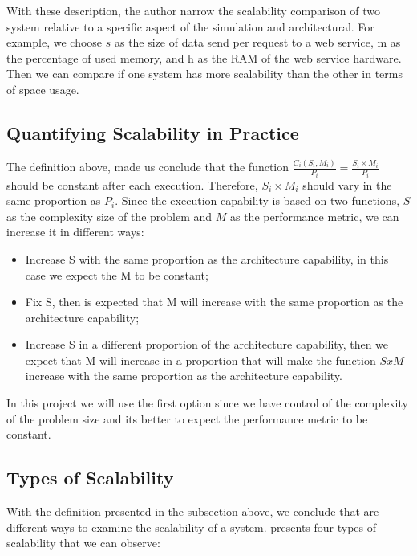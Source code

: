 With these description, the author narrow the scalability comparison of two system relative to a specific aspect of the simulation and architectural. For example, we choose $s$ as the size of data send per request to a web service, m as the percentage of used memory, and h as the RAM of the web service hardware. Then we can compare if one system has more scalability than the other in terms of space usage.

\subsection{Quantifying Scalability in Practice}

The definition above, made us conclude that the function $\frac{C_{i}(S_{i},M_{i})}{P_{i}} = \frac{S_{i} \times M_{i}}{P_{i}}$ should be constant after each execution. Therefore, $S_{i} \times M_{i}$ should vary in the same proportion as $P_{i}$. Since the execution capability is based on two functions, $S$ as the complexity size of the problem and $M$ as the performance metric, we can increase it in different ways:
\begin{itemize}
\item Increase S with the same proportion as the architecture capability, in this case we expect the M to be constant;
\item Fix S, then is expected that M will increase with the same proportion as the architecture capability;
\item Increase S in a different proportion of the architecture capability, then we expect that M will increase in a proportion that will make the function $SxM$ increase with the same proportion as the architecture capability.
\end{itemize}

In this project we will use the first option since we have control of the complexity of the problem size and its better to expect the performance metric to be constant.


\subsection{Types of Scalability}
With the definition presented in the subsection above, we conclude that are different ways to examine the scalability of a system. \cite{BONDI} presents four types of scalability that we can observe:


